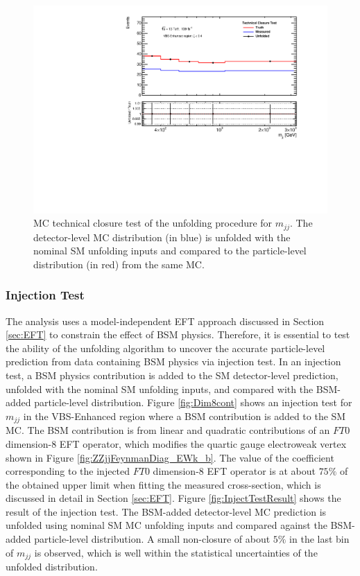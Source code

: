 \begin{figure}[!htb]
\centering
\includegraphics[width=.6\textwidth]{figures/Analysis/Unfolding/technical_closure_VBS_Enhanced.pdf}
\caption{MC technical closure test of the unfolding procedure for $m_{jj}$. The detector-level MC distribution (in blue) is unfolded with the nominal SM unfolding inputs and compared to the particle-level distribution (in red) from the same MC.\label{fig:unfolding_technical_closure}}
\end{figure}

\subsubsection{Injection Test}
\label{subsubsec:InjectionTest}
The analysis uses a model-independent EFT approach discussed in Section \ref{sec:EFT} to constrain the effect of BSM physics. Therefore, it is essential to test the ability of the unfolding algorithm to uncover the accurate particle-level prediction from data containing BSM physics via injection test. In an injection test, a BSM physics contribution is added to the SM detector-level prediction, unfolded with the nominal SM unfolding inputs, and compared with the BSM-added particle-level distribution. Figure \ref{fig:Dim8cont} shows an injection test for $m_{jj}$ in the VBS-Enhanced region where a BSM contribution is added to the SM MC. The BSM contribution is from linear and quadratic contributions of an $FT0$ dimension-8 EFT operator, which modifies the quartic gauge electroweak vertex shown in Figure \ref{fig:ZZjjFeynmanDiag_EWk_b}. The value of the coefficient corresponding to the injected $FT0$ dimension-8 EFT operator is at about $75\%$ of the obtained upper limit when fitting the measured cross-section, which is discussed in detail in Section \ref{sec:EFT}. Figure \ref{fig:InjectTestResult} shows the result of the injection test. The BSM-added detector-level MC prediction is unfolded using nominal SM MC unfolding inputs and compared against the BSM-added particle-level distribution. A small non-closure of about $5\%$ in the last bin of $m_{jj}$ is observed, which is well within the statistical uncertainties of the unfolded distribution.

